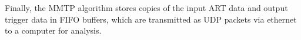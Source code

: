 Finally, the MMTP algorithm stores copies of the input ART data and output trigger data in FIFO buffers,
 which are transmitted as UDP packets via ethernet to a computer for analysis.

%
%

